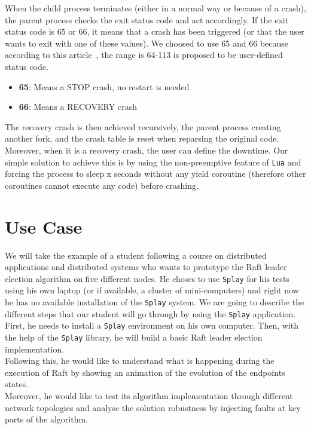 \documentclass{eplmastersthesis}
\begin{document}
        When the child process terminates (either in a normal way or because
        of a crash), the parent process checks the exit status code and act
        accordingly. If the exit status code is 65 or 66, it means that a
        crash has been triggered (or that the user wants to exit
        with one of these values). We choosed to use 65 and 66 because
        according to this article~\cite{StatusCode}, the range is 64-113
        is proposed to be user-defined status code.

        \begin{itemize}
          \item \textbf{65}: Means a STOP crash, no restart is needed
          \item \textbf{66}: Means a RECOVERY crash
        \end{itemize}

        The recovery crash is then achieved recursively, the parent process
        creating another fork, and the crash table is reset when reparsing
        the original code. Moreover, when it is a recovery crash, the user
        can define the downtime. Our simple solution to achieve this is by
        using the non-preemptive feature of \texttt{Lua} and forcing the process
        to sleep x seconds without any yield coroutine (therefore other
        coroutines cannot execute any code) before crashing.

  \chapter{Use Case}
  \label{chap:usercase}

    We will take the example of a student following a course on distributed
    applications and distributed systems who wants to prototype the Raft
    leader election algorithm on five different nodes. He choses to use
    \texttt{Splay} for his tests using his own laptop (or if available, a cluster
    of mini-computers) and right now he has no available installation of the
    \texttt{Splay} system. We are going to describe the different steps that our
    student will go through by using the \texttt{Splay} application.\\

    First, he needs to install a \texttt{Splay} environment on his own computer. Then,
    with the help of the \texttt{Splay} library, he will build a basic Raft leader
    election implementation.\\
    Following this, he would like to understand what is happening during the
    execution of Raft by showing an animation of the evolution of the
    endpoints states.\\
    Moreover, he would like to test its algorithm implementation through
    different network topologies and analyse the solution
    robustness by injecting faults at key parts of the algorithm.
\end{document}
